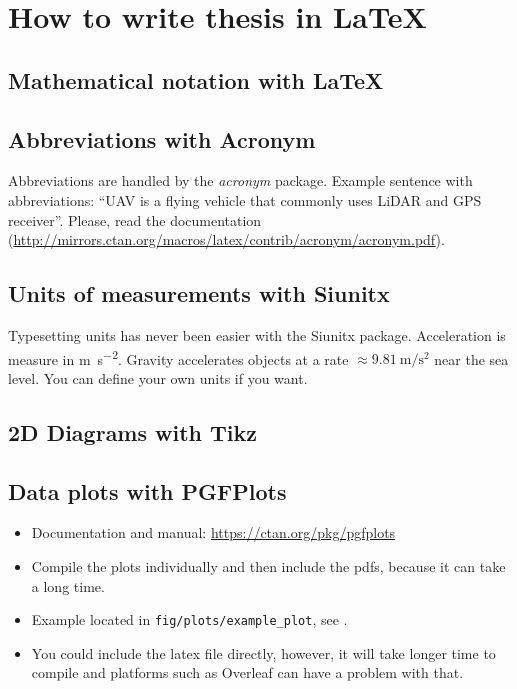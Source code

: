 \chapter{How to write thesis in LaTeX}

\section{Mathematical notation with LaTeX}

\section{Abbreviations with Acronym}

Abbreviations are handled by the \emph{acronym} package.
Example sentence with abbreviations: ``\ac{UAV} is a flying vehicle that commonly uses \ac{LiDAR} and \ac{GPS} receiver''.
Please, read the documentation (\url{http://mirrors.ctan.org/macros/latex/contrib/acronym/acronym.pdf}).

\section{Units of measurements with Siunitx}

Typesetting units has never been easier with the Siunitx package.
Acceleration is measure in \si{\meter\per\second\squared}.
Gravity accelerates objects at a rate $\approx \SI{9.81}{\meter\per\second\squared}$ near the sea level.
You can define your own units if you want.

\section{2D Diagrams with Tikz}

\section{Data plots with PGFPlots}

\begin{itemize}
  \item Documentation and manual: \url{https://ctan.org/pkg/pgfplots}
  \item Compile the plots individually and then include the pdfs, because it can take a long time.
  \item Example located in \texttt{fig/plots/example\_plot}, see .
  \item You could include the latex file directly, however, it will take longer time to compile and platforms such as Overleaf can have a problem with that.
\end{itemize}

